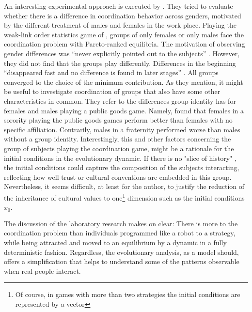 An interesting experimental approach is executed by 
\textcite{dufwenberg_gender_2005}. They tried to evaluate whether 
there is a difference in coordination behavior across genders, motivated by 
the different treatment of males and females in the work place. Playing the 
weak-link order statistics game of \textcite{van_huyck_tacit_1990}, groups of 
only females or only males face the coordination problem with Pareto-ranked 
equilibria. The motivation of observing gender differences was 
``never explicitly pointed  out to the subjects'' 
\parencite{dufwenberg_gender_2005}.
However, they did not find that the groups play
differently. Differences in the beginning ``disappeared fast and no difference
is found in later stages'' \parencite[235]{dufwenberg_gender_2005}. 
All groups converged to the choice of the minimum
contribution. As they mention, it might be useful to investigate 
coordination of groups that also have some other 
characteristics in common. They refer to the differences group 
identity has for females and males playing a 
public goods game. Namely, \textcite{croson_groups_2008} found that 
females in a sorority playing the public goods games perform better than 
females with no specific affiliation. Contrarily, males in a fraternity 
performed worse than males without a group identity. 
Interestingly, this and other factors concerning the group of subjects 
playing the coordination game, might be a rationale for the 
initial conditions in the evolutionary dynamic. If there is no 
"slice of history" \parencite{friedman_economic_1998},
the initial conditions could capture the composition of the subjects 
interacting, reflecting how well trust or cultural conventions 
are embedded in this group. 
Nevertheless, it seems difficult, at least for the author, to justify
the reduction of the inheritance of cultural values to 
one\footnote{Of course, in games with more than two strategies 
the initial conditions are represented by a vector} dimension such 
as the initial conditions $x_0$.

The discussion of the laboratory research makes on clear: There is more
to the coordination problem than individuals programmed like a robot 
to a strategy, while being attracted and moved to an equilibrium by a 
dynamic in a fully deterministic fashion. Regardless, the evolutionary
analysis, as a model should, offers a simplification that helps to 
understand some of the patterns observable when real people interact. 
